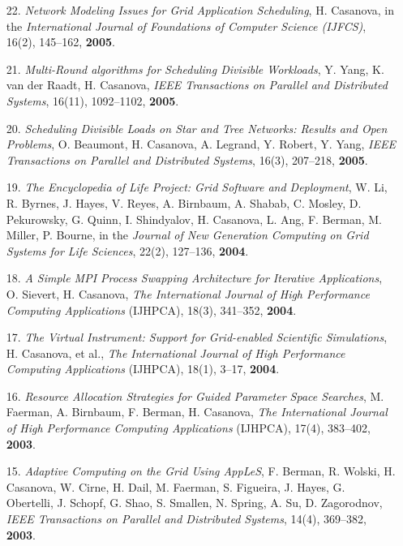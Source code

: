 \begin{enumerate}
\item [22.]
{\it Network Modeling Issues for Grid Application Scheduling}, 
H. Casanova, in the \emph{International Journal of 
Foundations of Computer Science (IJFCS)}, 16(2), 145--162, {\bf 2005}.

\item [21.] 
{\it Multi-Round algorithms for Scheduling Divisible Workloads},
Y. Yang, K. van der Raadt, H. Casanova, \emph{IEEE Transactions on
Parallel and Distributed Systems}, 16(11), 1092--1102, {\bf 2005}.

\item [20.]
{\it Scheduling Divisible Loads on Star and Tree Networks: Results
and Open Problems}, O. Beaumont, H. Casanova, A. Legrand, Y. Robert,
Y. Yang, \emph{IEEE Transactions on Parallel and Distributed
Systems}, 16(3), 207--218, {\bf 2005}.

\item [19.]
{\it The Encyclopedia of Life Project: Grid Software and Deployment},
W. Li, R. Byrnes, J. Hayes, V. Reyes, A. Birnbaum, A. Shabab, C. Mosley,
D. Pekurowsky, G. Quinn, I. Shindyalov, H. Casanova, L. Ang, F. Berman,
M. Miller, P. Bourne, in the \emph{Journal of New Generation Computing
on Grid Systems for Life Sciences}, 22(2), 127--136, {\bf 2004}.

\item [18.]
{\it A Simple MPI Process Swapping Architecture for Iterative
Applications}, O. Sievert, H. Casanova, \emph{The International Journal
of High Performance Computing Applications} (IJHPCA), 18(3),  341--352,
{\bf 2004}.

\item [17.]
{\it The Virtual Instrument: Support for Grid-enabled Scientific
Simulations}, H. Casanova, et al., \emph{The International Journal of High
Performance Computing Applications} (IJHPCA), 18(1), 3--17, {\bf 2004}.

\item [16.] 
{\it Resource Allocation Strategies for Guided Parameter Space Searches},
M. Faerman, A. Birnbaum, F. Berman, H. Casanova, \emph{The International
Journal of High Performance Computing Applications} (IJHPCA), 
17(4),  383--402, {\bf 2003}.

\item [15.]
{\it Adaptive Computing on the Grid Using AppLeS}, F. Berman, R. Wolski,
H. Casanova, W. Cirne, H. Dail, M. Faerman, S. Figueira, J. Hayes,
G. Obertelli, J. Schopf, G. Shao, S. Smallen, N. Spring, A. Su,
D. Zagorodnov, \emph{IEEE Transactions on Parallel and Distributed
Systems}, 14(4), 369--382, {\bf 2003}.


\end{enumerate}
